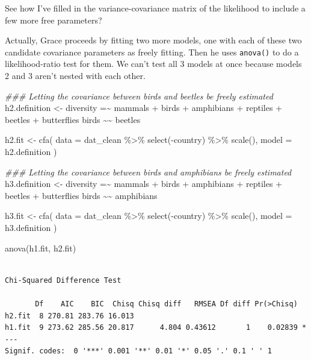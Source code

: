 \documentclass[
  letterpaper,
  DIV=11,
  numbers=noendperiod]{scrreprt}
\newenvironment{Shaded}{\begin{snugshade}}{\end{snugshade}}
\newcommand{\AttributeTok}[1]{\textcolor[rgb]{0.40,0.45,0.13}{#1}}
\newcommand{\DocumentationTok}[1]{\textcolor[rgb]{0.37,0.37,0.37}{\textit{#1}}}
\newcommand{\FunctionTok}[1]{\textcolor[rgb]{0.28,0.35,0.67}{#1}}
\newcommand{\NormalTok}[1]{\textcolor[rgb]{0.00,0.23,0.31}{#1}}
\newcommand{\OtherTok}[1]{\textcolor[rgb]{0.00,0.23,0.31}{#1}}
\newcommand{\SpecialCharTok}[1]{\textcolor[rgb]{0.37,0.37,0.37}{#1}}
\newcommand{\StringTok}[1]{\textcolor[rgb]{0.13,0.47,0.30}{#1}}
\begin{document}
See how I've filled in the variance-covariance matrix of the likelihood
to include a few more free parameters?

Actually, Grace proceeds by fitting two more models, one with each of
these two candidate covariance parameters as freely fitting. Then he
uses \texttt{anova()} to do a likelihood-ratio test for them. We can't
test all 3 models at once because models 2 and 3 aren't nested with each
other.

\begin{Shaded}
\begin{Highlighting}[]
\DocumentationTok{\#\#\# Letting the covariance between birds and beetles be freely estimated}
\NormalTok{h2.definition }\OtherTok{\textless{}{-}} 
\StringTok{\textquotesingle{}diversity =\textasciitilde{} mammals + birds + amphibians + }
\StringTok{              reptiles + beetles + butterflies}
\StringTok{ }
\StringTok{ birds \textasciitilde{}\textasciitilde{} beetles\textquotesingle{}}


\NormalTok{h2.fit }\OtherTok{\textless{}{-}} \FunctionTok{cfa}\NormalTok{(}
  \AttributeTok{data  =}\NormalTok{ dat\_clean }\SpecialCharTok{\%\textgreater{}\%} \FunctionTok{select}\NormalTok{(}\SpecialCharTok{{-}}\NormalTok{country) }\SpecialCharTok{\%\textgreater{}\%} \FunctionTok{scale}\NormalTok{(),}
  \AttributeTok{model =}\NormalTok{ h2.definition}
\NormalTok{)}

\DocumentationTok{\#\#\# Letting the covariance between birds and amphibians be freely estimated}
\NormalTok{h3.definition }\OtherTok{\textless{}{-}} 
  \StringTok{\textquotesingle{}diversity =\textasciitilde{} mammals + birds + amphibians + }
\StringTok{              reptiles + beetles + butterflies}
\StringTok{ }
\StringTok{ birds \textasciitilde{}\textasciitilde{} amphibians\textquotesingle{}}


\NormalTok{h3.fit }\OtherTok{\textless{}{-}} \FunctionTok{cfa}\NormalTok{(}
 \AttributeTok{data  =}\NormalTok{ dat\_clean }\SpecialCharTok{\%\textgreater{}\%} \FunctionTok{select}\NormalTok{(}\SpecialCharTok{{-}}\NormalTok{country) }\SpecialCharTok{\%\textgreater{}\%} \FunctionTok{scale}\NormalTok{(),}
  \AttributeTok{model =}\NormalTok{ h3.definition}
\NormalTok{)}

\FunctionTok{anova}\NormalTok{(h1.fit, h2.fit)}
\end{Highlighting}
\end{Shaded}

\begin{verbatim}

Chi-Squared Difference Test

       Df    AIC    BIC  Chisq Chisq diff   RMSEA Df diff Pr(>Chisq)  
h2.fit  8 270.81 283.76 16.013                                        
h1.fit  9 273.62 285.56 20.817      4.804 0.43612       1    0.02839 *
---
Signif. codes:  0 '***' 0.001 '**' 0.01 '*' 0.05 '.' 0.1 ' ' 1
\end{verbatim}
\end{document}
